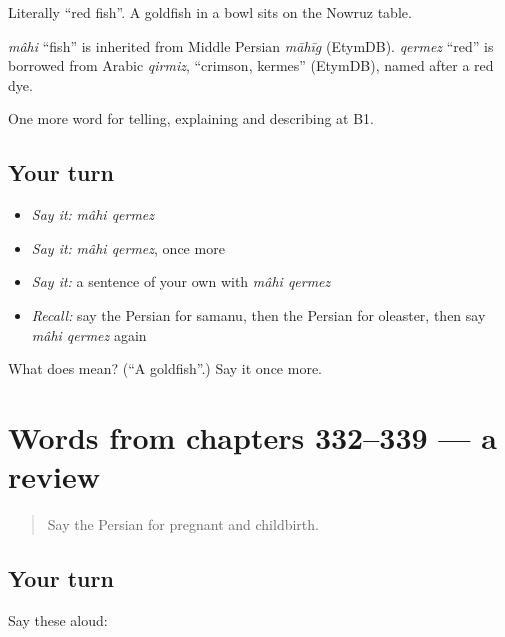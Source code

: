 Literally \textquotedblleft{}red fish\textquotedblright{}. A goldfish in a bowl sits on the Nowruz table.

\begin{cousinweb}
\emph{mâhi} \textquotedblleft{}fish\textquotedblright{} is inherited from Middle Persian \emph{māhīg} (EtymDB). \emph{qermez} \textquotedblleft{}red\textquotedblright{} is borrowed from Arabic \emph{qirmiz}, \textquotedblleft{}crimson, kermes\textquotedblright{} (EtymDB), named after a red dye.
\end{cousinweb}

\begin{grammarlens}[title={What you've built}]
One more word for telling, explaining and describing at B1.
\end{grammarlens}

\subsection*{Your turn}
\begin{itemize}
\raggedright
  \item \emph{Say it:} \emph{mâhi qermez}
  \item \emph{Say it:} \emph{mâhi qermez}, once more
  \item \emph{Say it:} a sentence of your own with \emph{mâhi qermez}
  \item \emph{Recall:} say the Persian for samanu, then the Persian for oleaster, then say \emph{mâhi qermez} again
\end{itemize}

\begin{tcolorbox}[breakable,colback=teal!4,colframe=teal!35!black,title={Before you move on}]
What does   mean? (\textquotedblleft{}A goldfish\textquotedblright{}.) Say it once more.
\end{tcolorbox}
\section[(dialogue)]{Words from chapters 332–339 — a review}

\label{lesson:FA-R339-review-332-339}



\begin{quote}
Say the Persian for pregnant and childbirth.
\end{quote}

\subsection*{Your turn}
Say these aloud:

